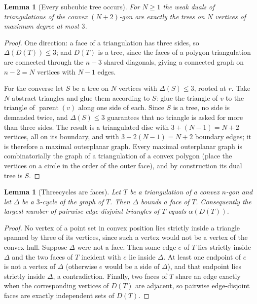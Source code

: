 \documentclass[11pt]{article}
\theoremstyle{plain}
\newtheorem{lemma}[theorem]{Lemma}
\theoremstyle{definition}
\theoremstyle{remark}
\begin{document}
\begin{lemma}[Every subcubic tree occurs]\label{lem:subcubic}
For $N\ge 1$ the weak duals of triangulations of the convex $(N+2)$-gon are exactly the
trees on $N$ vertices of maximum degree at most $3$.
\end{lemma}

\begin{proof}
One direction: a face of a triangulation has three sides, so $\Delta(D(T))\le 3$; and
$D(T)$ is a tree, since the faces of a polygon triangulation are connected through the
$n-3$ shared diagonals, giving a connected graph on $n-2=N$ vertices with $N-1$ edges.

For the converse let $S$ be a tree on $N$ vertices with $\Delta(S)\le 3$, rooted at $r$.
Take $N$ abstract triangles and glue them according to $S$: glue the triangle of $v$ to
the triangle of $\operatorname{parent}(v)$ along one side of each.  Since $S$ is a tree, no
side is demanded twice, and $\Delta(S)\le 3$ guarantees that no triangle is asked for more
than three sides.  The result is a triangulated disc with $3+(N-1)=N+2$ vertices, all on
its boundary, and with $3+2(N-1)=N+2$ boundary edges; it is therefore a maximal outerplanar
graph.  Every maximal outerplanar graph is combinatorially the graph of a triangulation of
a convex polygon (place the vertices on a circle in the order of the outer face), and by
construction its dual tree is $S$.
\end{proof}

\begin{lemma}[Threecycles are faces]\label{lem:faces}
Let $T$ be a triangulation of a convex $n$-gon and let $\Delta$ be a $3$-cycle of the graph
of $T$.  Then $\Delta$ bounds a face of $T$.  Consequently the largest number of pairwise
edge-disjoint triangles of $T$ equals $\alpha(D(T))$.
\end{lemma}

\begin{proof}
No vertex of a point set in convex position lies strictly inside a triangle spanned by
three of its vertices, since such a vertex would not be a vertex of the convex hull.
Suppose $\Delta$ were not a face.  Then some edge $e$ of $T$ lies strictly inside $\Delta$
and the two faces of $T$ incident with $e$ lie inside $\Delta$.  At least one endpoint of
$e$ is not a vertex of $\Delta$ (otherwise $e$ would be a side of $\Delta$), and that
endpoint lies strictly inside $\Delta$, a contradiction.  Finally, two faces of $T$ share an
edge exactly when the corresponding vertices of $D(T)$ are adjacent, so pairwise
edge-disjoint faces are exactly independent sets of $D(T)$.
\end{proof}
\end{document}
